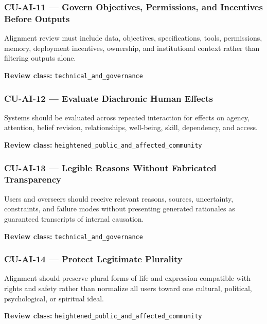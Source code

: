 \documentclass[
  11pt,
]{article}
\begin{document}
\subsubsection{CU-AI-11 --- Govern Objectives, Permissions, and
Incentives Before
Outputs}\label{cu-ai-11-govern-objectives-permissions-and-incentives-before-outputs}

Alignment review must include data, objectives, specifications, tools,
permissions, memory, deployment incentives, ownership, and institutional
context rather than filtering outputs alone.

\textbf{Review class:} \texttt{technical\_and\_governance}

\subsubsection{CU-AI-12 --- Evaluate Diachronic Human
Effects}\label{cu-ai-12-evaluate-diachronic-human-effects}

Systems should be evaluated across repeated interaction for effects on
agency, attention, belief revision, relationships, well-being, skill,
dependency, and access.

\textbf{Review class:}
\texttt{heightened\_public\_and\_affected\_community}

\subsubsection{CU-AI-13 --- Legible Reasons Without Fabricated
Transparency}\label{cu-ai-13-legible-reasons-without-fabricated-transparency}

Users and overseers should receive relevant reasons, sources,
uncertainty, constraints, and failure modes without presenting generated
rationales as guaranteed transcripts of internal causation.

\textbf{Review class:} \texttt{technical\_and\_governance}

\subsubsection{CU-AI-14 --- Protect Legitimate
Plurality}\label{cu-ai-14-protect-legitimate-plurality}

Alignment should preserve plural forms of life and expression compatible
with rights and safety rather than normalize all users toward one
cultural, political, psychological, or spiritual ideal.

\textbf{Review class:}
\texttt{heightened\_public\_and\_affected\_community}
\end{document}
